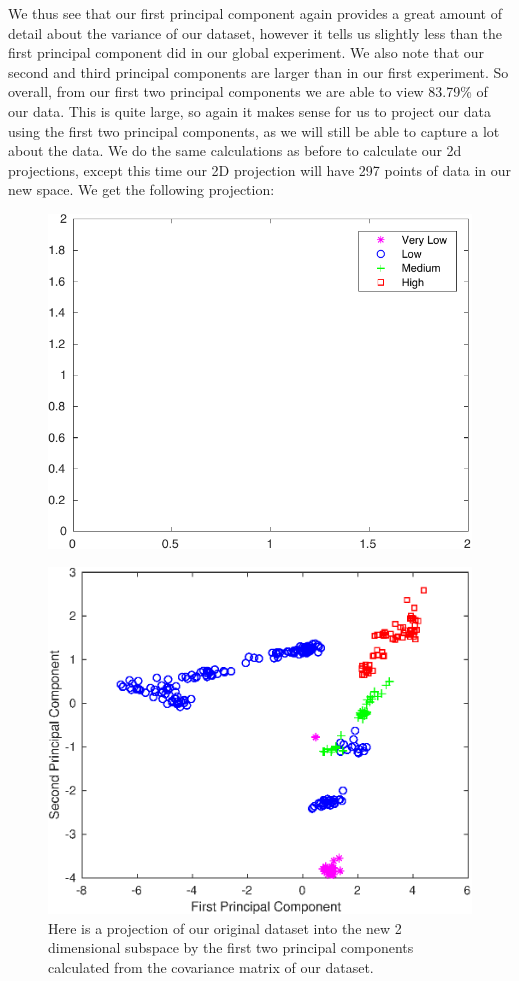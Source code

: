 \documentclass{article}
\begin{document}
We thus see that our first principal component again provides a great amount of detail about the variance of our dataset, however it tells us slightly less than the first principal component did in our global experiment. We also note that our second and third principal components are larger than in our first experiment. So overall, from our first two principal components we are able to view 83.79\% of our data. This is quite large, so again it makes sense for us to project our data using the first two principal components, as we will still be able to capture a lot about the data. We do the same calculations as before to calculate our 2d projections, except this time our 2D projection will have 297 points of data in our new space. We get the following projection:
\begin{figure}[H]
\centering
\includegraphics[scale = 0.7]{local/legend_2D_proj_copy.pdf}
\end{figure}
\begin{figure}[H]
\centering
\caption{Here is a projection of our original dataset into the new 2 dimensional subspace by the first two principal components calculated from the covariance matrix of our dataset.}
\includegraphics{local/eth_2d_projection_supply.eps}
\end{figure}
\end{document}
